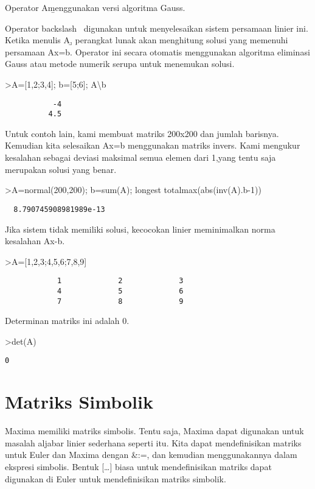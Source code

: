 \documentclass[
]{book}
\begin{document}
Operator A\b menggunakan versi algoritma Gauss.

Operator backslash ~digunakan untuk menyelesaikan sistem persamaan linier ini. Ketika menulis A\b, perangkat lunak akan menghitung solusi yang memenuhi persamaan Ax=b. Operator ini secara otomatis menggunakan algoritma eliminasi Gauss atau metode numerik serupa untuk menemukan solusi.

\textgreater A={[}1,2;3,4{]}; b={[}5;6{]}; A\textbackslash b

\begin{verbatim}
           -4 
          4.5 
\end{verbatim}

Untuk contoh lain, kami membuat matriks 200x200 dan jumlah barisnya. Kemudian kita selesaikan Ax=b menggunakan matriks invers. Kami mengukur kesalahan sebagai deviasi maksimal semua elemen dari 1,yang tentu saja merupakan solusi yang benar.

\textgreater A=normal(200,200); b=sum(A); longest totalmax(abs(inv(A).b-1))

\begin{verbatim}
  8.790745908981989e-13 
\end{verbatim}

Jika sistem tidak memiliki solusi, kecocokan linier meminimalkan norma kesalahan Ax-b.

\textgreater A={[}1,2,3;4,5,6;7,8,9{]}

\begin{verbatim}
            1             2             3 
            4             5             6 
            7             8             9 
\end{verbatim}

Determinan matriks ini adalah 0.

\textgreater det(A)

\begin{verbatim}
0
\end{verbatim}

\section{Matriks Simbolik}\label{matriks-simbolik}

Maxima memiliki matriks simbolis. Tentu saja, Maxima dapat digunakan untuk masalah aljabar linier sederhana seperti itu. Kita dapat mendefinisikan matriks untuk Euler dan Maxima dengan \&:=, dan kemudian menggunakannya dalam ekspresi simbolis. Bentuk {[}\ldots{]} biasa untuk mendefinisikan matriks dapat digunakan di Euler untuk mendefinisikan matriks simbolik.
\end{document}
